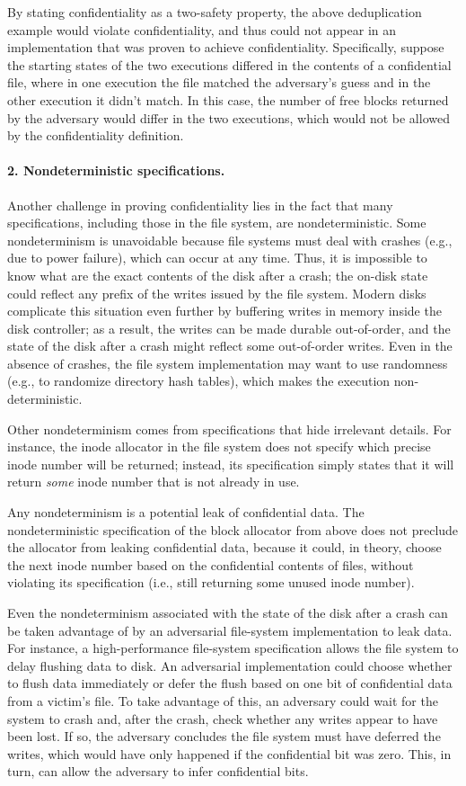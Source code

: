 By stating confidentiality as a two-safety property, the above
deduplication example would violate confidentiality, and thus could not
appear in an implementation that was proven to achieve confidentiality.
Specifically, suppose the starting states of the two executions differed
in the contents of a confidential file, where in one execution the file
matched the adversary's guess and in the other execution it didn't match.
In this case, the number of free blocks returned by the adversary
would differ in the two executions, which would not be allowed by the
confidentiality definition.

\paragraph{2. Nondeterministic specifications.}
Another challenge in proving confidentiality lies in the fact
that many specifications, including those in the file system, are
nondeterministic.  Some nondeterminism is unavoidable because file
systems must deal with crashes (e.g., due to power failure), which can
occur at any time.  Thus, it is impossible to
know what are the exact contents of the disk after a crash; the on-disk
state could reflect any prefix of the writes issued by the file system.
Modern disks complicate this situation even further by buffering writes
in memory inside the disk controller; as a result, the writes can be
made durable out-of-order, and the state of the disk after a crash might
reflect some out-of-order writes.  Even in the absence of crashes, the
file system implementation may want to use randomness (e.g., to randomize
directory hash tables), which makes the execution non-deterministic.

Other nondeterminism comes from specifications that hide irrelevant
details.  For instance, the inode allocator in the file system does
not specify which precise inode number will be returned; instead,
its specification simply states that it will return
\emph{some} inode number that is not already in use.

Any nondeterminism is a potential leak of confidential data.  The
nondeterministic specification of the block allocator from above does not
preclude the allocator from leaking confidential data, because it could,
in theory, choose the next inode number based on the confidential contents
of files, without violating its specification (i.e., still returning some
unused inode number).

Even the nondeterminism associated with the state of the disk
after a crash can be taken advantage of by an adversarial file-system
implementation to leak data.  For instance, a high-performance
file-system specification allows the file system to delay flushing data
to disk.  An adversarial implementation could choose whether to flush
data immediately or defer the flush based on one bit of confidential
data from a victim's file.  To take advantage of this, an adversary
could wait for the system to crash and, after the crash, check whether
any writes appear to have been lost.  If so, the adversary concludes
the file system must have deferred the writes, which would have only
happened if the confidential bit was zero.  This, in turn, can allow
the adversary to infer confidential bits.

